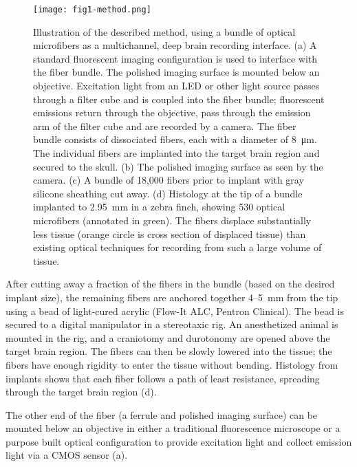 \begin{figure}
\texttt{[image: fig1-method.png]}
\caption[Diagram of optics and fiber interface]{Illustration of the described method, using a bundle of optical microfibers as a multichannel, deep brain recording interface. (a) A standard fluorescent imaging configuration is used to interface with the fiber bundle. The polished imaging surface is mounted below an objective. Excitation light from an LED or other light source passes through a filter cube and is coupled into the fiber bundle; fluorescent emissions return through the objective, pass through the emission arm of the filter cube and are recorded by a camera. The fiber bundle consists of dissociated fibers, each with a diameter of 8~\si{\micro\meter}. The individual fibers are implanted into the target brain region and secured to the skull. (b) The polished imaging surface as seen by the camera. (c) A bundle of 18,000 fibers prior to implant with gray silicone sheathing cut away. (d) Histology at the tip of a bundle implanted to 2.95~mm in a zebra finch, showing 530 optical microfibers (annotated in green). The fibers displace substantially less tissue (orange circle is cross section of displaced tissue) than existing optical techniques for recording from such a large volume of tissue.}
\label{fig:method}
\end{figure}

After cutting away a fraction of the fibers in the bundle (based on the desired implant size), the remaining fibers are anchored together 4--5~mm from the tip using a bead of light-cured acrylic (Flow-It ALC, Pentron Clinical). The bead is secured to a digital manipulator in a stereotaxic rig. An anesthetized animal is mounted in the rig, and a craniotomy and durotonomy are opened above the target brain region. The fibers can then be slowly lowered into the tissue; the fibers have enough rigidity to enter the tissue without bending. Histology from implants shows that each fiber follows a path of least resistance, spreading through the target brain region (d).

The other end of the fiber (a ferrule and polished imaging surface) can be mounted below an objective in either a traditional fluorescence microscope or a purpose built optical configuration to provide excitation light and collect emission light via a CMOS sensor (a).

